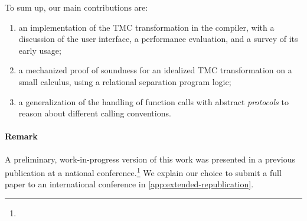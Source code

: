 To sum up, our main contributions are:
\begin{enumerate}
    \item an implementation of the TMC transformation in the \OCaml compiler, with a discussion of the user interface, a performance evaluation, and a survey of its early usage;
    \item a mechanized proof of soundness for an idealized TMC transformation on a small calculus, using a relational separation program logic;
    \item a generalization of the \Simuliris handling of function calls with abstract \emph{protocols} to reason about different calling conventions.
\end{enumerate}

\paragraph{Remark}
A preliminary, work-in-progress version of this work was presented in
a previous publication at a national
conference.\footnote{} We
explain our choice to submit a full paper to an international
conference in \cref{app:extended-republication}.

